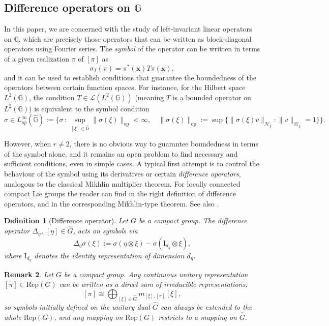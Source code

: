 \documentclass[12pt, reqno]{amsart}
\newtheorem{defi}{Definition}[section]
\newtheorem{rem}[defi]{Remark}
\newcommand{\1}{\mathds{1}}
\newcommand{\G}{\mathbb{G}}
\begin{document}
\subsection{Difference operators on $\mathbb{G}$}

In this paper, we are concerned with the study of left-invariant linear operators on $\mathbb{G}$, 
which are precisely those operators that can be written as block-diagonal operators using Fourier series. The \emph{symbol} of the operator can be written in terms of a given realization $\pi$ of $[\pi]$ as
\[
\sigma_T(\pi) = \pi^*(\mathbf{x}) T \pi(\mathbf{x}),
\]
and it can be used to establish conditions that guarantee the boundedness of the operators between 
certain function spaces. For instance, for the Hilbert space $L^2(\mathbb{G})$, the condition $T \in \mathcal{L}(L^2(\mathbb{G}))$ (meaning $T$ is a bounded operator on $L^2(\mathbb{G})$) is equivalent to 
the symbol condition
\[ \sigma \in L^\infty_{op} (\widehat{\G}) := \{ \sigma \, : \,  \sup_{[\xi] \in \widehat{\mathbb{G}}} \|\sigma(\xi)\|_{\text{op}} < \infty, 
\quad 
\|\sigma(\xi)\|_{\text{op}} := \sup\{\|\sigma(\xi)v\|_{\mathcal{H}_\xi} : \|v\|_{\mathcal{H}_\xi}=1\}\} 
.
\]

However, when $r \neq 2$, there is no obvious way to guarantee boundedness in terms of the symbol alone, and it remains an open problem to find necessary and sufficient conditions, even in simple cases. 
A typical first attempt is to control the behaviour of the symbol using its derivatives or certain 
\emph{difference operators}, analogous to the classical Mikhlin multiplier theorem. For locally connected compact Lie groups the reader can find in \cite{Ruzhansky2010, Ruzhansky2015} the right definition of difference operators, 
and in \cite{Ruzhansky2015} the corresponding Mikhlin-type theorem. See also \cite{Fischer2015, Fischer2020}.

\begin{defi}[Difference operator]\label{def:diff_op}\normalfont
Let $G$ be a compact group. The difference operator $\Delta_\eta$, $[\eta] \in \widehat{G}$, 
acts on symbols via
\[
\Delta_\eta \sigma(\xi) := \sigma(\eta \otimes \xi) - \sigma(\mathrm{I}_{d_\eta} \otimes \xi),
\]where $\mathrm{I}_{d_\eta}$ denotes the identity representation of dimension $d_\eta$.
\end{defi}

\begin{rem}
Let $G$ be a compact group. Any continuous unitary representation $[\pi] \in \mathrm{Rep}(G)$ can be written as a direct sum of irreducible 
representations:
\[
[\pi] \cong \bigoplus_{[\xi] \in \widehat{G}} m_{[\xi],[\pi]} [\xi],
\]
so symbols initially defined on the unitary dual $\widehat{G}$ can always be extended to the whole $\mathrm{Rep}(G)$, and any mapping 
on $\mathrm{Rep}(G)$ restricts to a mapping on $\widehat{G}$.
\end{rem}
\end{document}
